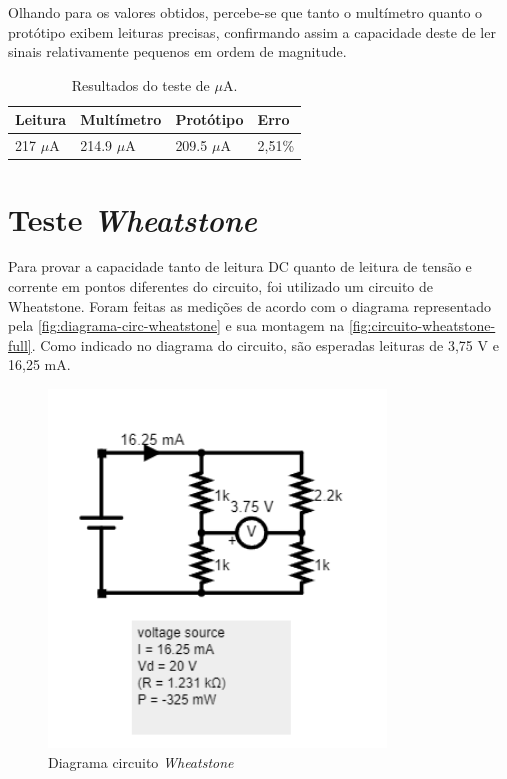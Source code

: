 Olhando para os valores obtidos, percebe-se que tanto o multímetro quanto o protótipo exibem leituras precisas, confirmando assim a capacidade deste de ler sinais relativamente pequenos em ordem de magnitude.

\begin{table}[!ht]
    \centering
    \caption{Resultados do teste de $\mu$A.}
    \label{tab:resultados-ua}
    \begin{tabular}{ l l l l }
        \hline
        \textbf{Leitura}  & \textbf{Multímetro}  & \textbf{Protótipo}  & \textbf{Erro}   \\ \hline
        217 $\mu$A        & 214.9 $\mu$A         & 209.5 $\mu$A        & 2,51\%             \\ \hline
    \end{tabular}
    \fonte{}
\end{table}

\section{Teste \textit{Wheatstone}}\label{teste-Wheatstone}

Para provar a capacidade tanto de leitura DC quanto de leitura de tensão e corrente em pontos diferentes do circuito, foi utilizado um circuito de Wheatstone. Foram feitas as medições de acordo com o diagrama representado pela \autoref{fig:diagrama-circ-wheatstone} e sua montagem na \autoref{fig:circuito-wheatstone-full}. Como indicado no diagrama do circuito, são esperadas leituras de 3,75 V e 16,25 mA.

\begin{figure}[htb!]
    \caption{Diagrama circuito \textit{Wheatstone}}
    \label{fig:diagrama-circ-wheatstone}
    \includegraphics[width=0.8\textwidth]{figuras/diagrama-circ-wheatstone.png}
    \fonte{}
\end{figure}

